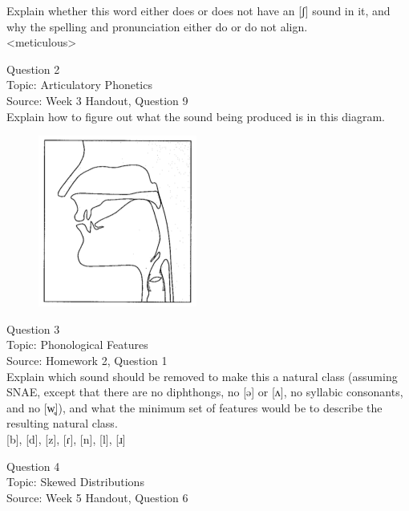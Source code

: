 \documentclass[12pt]{article}
\begin{document}
Explain whether this word either does or does not have an [ʃ] sound in it, and why the spelling and pronunciation either do or do not align.\\

<meticulous>


\newpage

{\large Question 2}\\

Topic: Articulatory Phonetics\\
Source: Week 3 Handout, Question 9\\

Explain how to figure out what the sound being produced is in this diagram.\\

\begin{figure}[H]
\includegraphics{../images/sagittal_k.png}
\end{figure}

\newpage

{\large Question 3}\\

Topic: Phonological Features\\
Source: Homework 2, Question 1\\

Explain which sound should be removed to make this a natural class (assuming SNAE, except that there are no diphthongs, no [ə] or [ʌ], no syllabic consonants, and no [w̥]), and what the minimum set of features would be to describe the resulting natural class.\\

{[b]}, {[d]}, {[z]}, {[ɾ]}, {[n]}, {[l]}, {[ɹ]}


\newpage

{\large Question 4}\\

Topic: Skewed Distributions\\
Source: Week 5 Handout, Question 6\\
\end{document}
